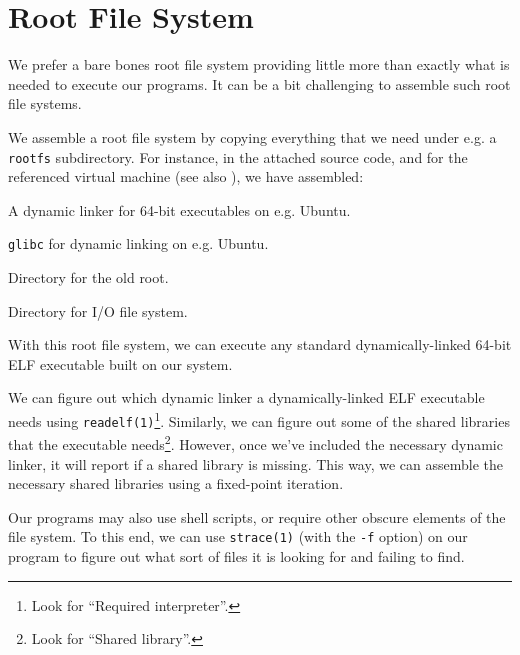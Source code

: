 
\section{Root File System}

\label{section:assessment-engine:root-file-system}

We prefer a bare bones root file system providing little more than exactly what
is needed to execute our programs. It can be a bit challenging to assemble such
root file systems.

We assemble a root file system by copying everything that we need under e.g. a
\texttt{rootfs} subdirectory. For instance, in the attached source code, and
for the referenced virtual machine (see also ), we
have assembled:

\begin{description}[\setleftmargin{0.2in}\breaklabel\setlabelstyle{\tt}]

\item [rootfs/lib64/ld-linux-x86-64.so.2] A dynamic linker for 64-bit
executables on e.g. Ubuntu.

\item [rootfs/lib/x86\_64-linux-gnu/libc.so.6] \texttt{glibc} for dynamic
linking on e.g. Ubuntu.

\item [rootfs/.oldroot] Directory for the old root.

\item [rootfs/home/student] Directory for I/O file system.

\end{description}

With this root file system, we can execute any standard dynamically-linked
64-bit ELF executable built on our system.

We can figure out which dynamic linker a dynamically-linked ELF executable
needs using \texttt{readelf(1)}\footnote{Look for ``Required interpreter''.}.
Similarly, we can figure out some of the shared libraries that the executable
needs\footnote{Look for ``Shared library''.}. However, once we've included the
necessary dynamic linker, it will report if a shared library is missing. This
way, we can assemble the necessary shared libraries using a fixed-point
iteration.

Our programs may also use shell scripts, or require other obscure elements of
the file system. To this end, we can use \texttt{strace(1)} (with the
\texttt{-f} option) on our program to figure out what sort of files it is
looking for and failing to find.

